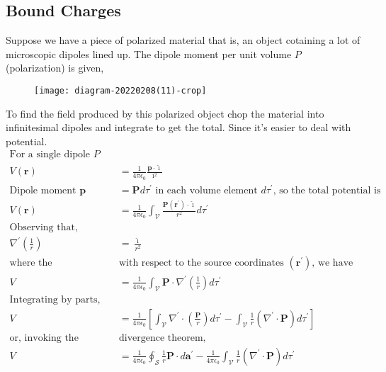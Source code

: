 \subsection{Bound Charges}
Suppose we have a piece of polarized material that is, an object cotaining a lot of microscopic dipoles lined up. The dipole moment per unit volume $P$ (polarization) is given, 
\begin{figure}[H]
	\centering
	\texttt{[image: diagram-20220208(11)-crop]}
\end{figure}
To find the field produced by this polarized object chop the material into infinitesimal dipoles and integrate to get the total. Since it's easier to deal with potential.
\begin{align*}
\text{For a single dipole $P$}\\
V(\mathbf{r})&=\frac{1}{4 \pi \epsilon_{0}} \frac{\mathbf{p} \cdot \hat{\imath}}{\imath^{2}}\\                                                         \text{Dipole moment }\mathbf{p}&=\mathbf{P} d \tau^{\prime}\text{ in each volume element }d \tau^{\prime}\text{, so the total potential is}\\
V(\mathbf{r})&=\frac{1}{4 \pi \epsilon_{0}} \int_{\mathcal{V}} \frac{\mathbf{P}\left(\mathbf{r}^{\prime}\right) \cdot \hat{\imath}}{r^{2}} d \tau^{\prime}\\
\text{Observing that,}\\
\nabla^{\prime}\left(\frac{1}{r}\right)&=\frac{\hat{\imath}}{r^{2}}\\
\text{where  the differentiation is }&\text{with respect  to the source coordinates $\left(\mathbf{r}^{\prime}\right)$, we have}\\
V&=\frac{1}{4 \pi \epsilon_{0}} \int_{\mathcal{V}} \mathbf{P} \cdot \nabla^{\prime}\left(\frac{1}{r}\right) d \tau^{\prime}\\
\text{Integrating by parts,  gives}\\
V&=\frac{1}{4 \pi \epsilon_{0}}\left[\int_{\mathcal{V}} \nabla^{\prime} \cdot\left(\frac{\mathbf{P}}{r}\right) d \tau^{\prime}-\int_{\mathcal{V}} \frac{1}{r}\left(\nabla^{\prime} \cdot \mathbf{P}\right) d \tau^{\prime}\right]\\
\text{or, invoking the }&\text{divergence theorem,}\\
V&=\frac{1}{4 \pi \epsilon_{0}} \oint_{\mathcal{S}} \frac{1}{r} \mathbf{P} \cdot d \mathbf{a}^{\prime}-\frac{1}{4 \pi \epsilon_{0}} \int_{\mathcal{V}} \frac{1}{r}\left(\nabla^{\prime} \cdot \mathbf{P}\right) d \tau^{\prime}\\

\end{align*}
